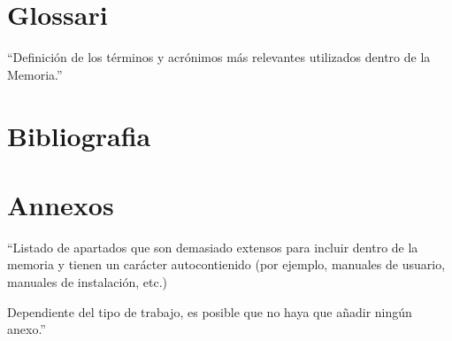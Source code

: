 \documentclass[11pt,a4paper]{article}
\begin{document}
\newpage 


\section{Glossari}
``Definición de los términos y acrónimos más relevantes utilizados dentro de la Memoria.''
\newpage 


\section{Bibliografia}



\newpage 


\section{Annexos}
``Listado de apartados que son demasiado extensos para incluir dentro de la memoria y tienen un carácter autocontienido (por ejemplo, manuales de usuario, manuales de instalación, etc.) 

Dependiente del tipo de trabajo, es posible que no haya que añadir ningún anexo.''
\end{document}
